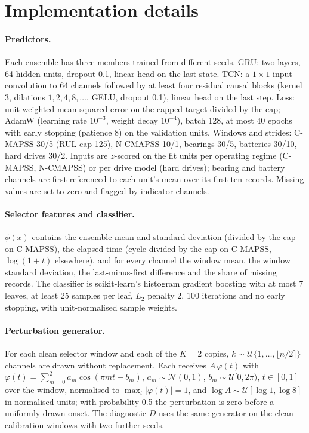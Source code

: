 \documentclass{esannV2}
\begin{document}
\FloatBarrier
\section{Implementation details}\label{app:impl}
\paragraph{Predictors.} Each ensemble has three members trained from different seeds. GRU: two layers, 64 hidden units, dropout 0.1, linear head on the last state. TCN: a $1\times1$ input convolution to 64 channels followed by at least four residual causal blocks (kernel 3, dilations $1,2,4,8,\dots$, GELU, dropout 0.1), linear head on the last step. Loss: unit-weighted mean squared error on the capped target divided by the cap; AdamW (learning rate $10^{-3}$, weight decay $10^{-4}$), batch 128, at most 40 epochs with early stopping (patience 8) on the validation units. Windows and strides: C-MAPSS 30/5 (RUL cap 125), N-CMAPSS 10/1, bearings 30/5, batteries 30/10, hard drives 30/2. Inputs are $z$-scored on the fit units per operating regime (C-MAPSS, N-CMAPSS) or per drive model (hard drives); bearing and battery channels are first referenced to each unit's mean over its first ten records. Missing values are set to zero and flagged by indicator channels.
\paragraph{Selector features and classifier.} $\phi(x)$ contains the ensemble mean and standard deviation (divided by the cap on C-MAPSS), the elapsed time (cycle divided by the cap on C-MAPSS, $\log(1+t)$ elsewhere), and for every channel the window mean, the window standard deviation, the last-minus-first difference and the share of missing records. The classifier is scikit-learn's histogram gradient boosting with at most 7 leaves, at least 25 samples per leaf, $L_2$ penalty 2, 100 iterations and no early stopping, with unit-normalised sample weights.
\paragraph{Perturbation generator.} For each clean selector window and each of the $K=2$ copies, $k\sim\mathcal U\{1,\dots,\lfloor n/2\rceil\}$ channels are drawn without replacement. Each receives $A\,\varphi(t)$ with $\varphi(t)=\sum_{m=0}^{2}a_m\cos(\pi m t+b_m)$, $a_m\sim\mathcal N(0,1)$, $b_m\sim\mathcal U[0,2\pi)$, $t\in[0,1]$ over the window, normalised to $\max_t|\varphi(t)|=1$, and $\log A\sim\mathcal U[\log1,\log8]$ in normalised units; with probability 0.5 the perturbation is zero before a uniformly drawn onset. The diagnostic $D$ uses the same generator on the clean calibration windows with two further seeds.
\end{document}
